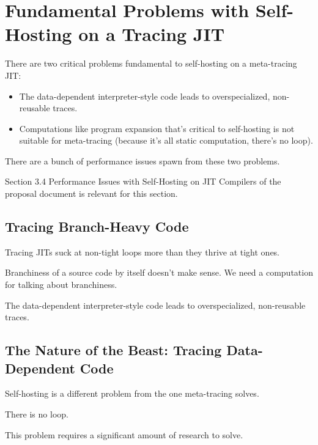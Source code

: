 \chapter{Fundamental Problems with Self-Hosting on a Tracing JIT}

	\label{chapter:problem}

	\begin{chapterpoint}
		There are two critical problems fundamental to self-hosting on a meta-tracing JIT:
		\begin{itemize}
			\item The data-dependent interpreter-style code leads to overspecialized, non-reusable traces.
			\item Computations like program expansion that's critical to self-hosting is not suitable for meta-tracing (because it's all static computation, there's no loop).
		\end{itemize}
		There are a bunch of performance issues spawn from these two problems.
	\end{chapterpoint}

	\begin{todo}[Import]
			Section 3.4 Performance Issues with Self-Hosting on JIT Compilers of the proposal document is relevant for this section.
	\end{todo}


	\section{Tracing Branch-Heavy Code}
		\begin{mainpoint}
		 	Tracing JITs suck at non-tight loops more than they thrive at tight ones.

			Branchiness of a source code by itself doesn't make sense. We need a computation for talking about branchiness.

			The data-dependent interpreter-style code leads to overspecialized, non-reusable traces.
		\end{mainpoint}

	\section{The Nature of the Beast: Tracing Data-Dependent Code}
		\begin{mainpoint}
			Self-hosting is a different problem from the one meta-tracing solves.

			There is no loop.

			This problem requires a significant amount of research to solve.
		\end{mainpoint}



